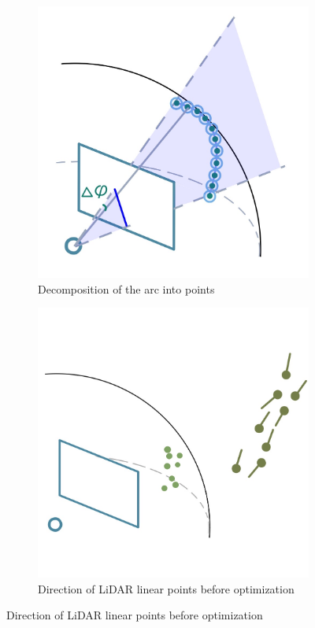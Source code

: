 \begin{figure}
  \centering
  \begin{subfigure}{0.47\linewidth}
    \centering
    \includegraphics[width=\linewidth]{images/arc_sphere.jpg}
    \caption{Decomposition of the arc into points}
    \label{fig:arc}
  \end{subfigure}
  \hfill
  \begin{subfigure}{0.47\linewidth}
    \centering
    \includegraphics[width=\linewidth]{images/lidar_bad_direction.jpg}
    \caption{Direction of LiDAR linear points before optimization}
    \label{fig:lidar_bad_direction}
  \end{subfigure}


\end{figure}
